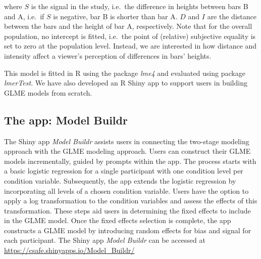 
where $S$ is the signal in the study, i.e.\ the difference in heights between bars B and A, i.e.\ if $S$ is negative, bar B is shorter than bar A.
$D$ and $I$ are the distance between the bars and the height of bar A, respectively. 
Note that for the overall population, no intercept is fitted, i.e.\ the point of (relative) subjective equality is set to zero at the population level. Instead, we are interested in how distance and intensity affect a viewer's perception of differences in bars' heights. 

This model is fitted in R using the package \textit{lme4} \cite{lme4} and evaluated using package \textit{lmerTest}\cite{lmerTest}. We have also developed an R Shiny app \cite{shiny} to support users in building GLME models from scratch.

\subsection{The app: Model Buildr}

The Shiny app {\it Model Buildr} assists users in connecting the two-stage modeling approach with the GLME modeling approach. Users can construct their GLME models incrementally, guided by prompts within the app. The process starts with a basic logistic regression for a single participant with one condition level per condition variable. Subsequently, the app extends the logistic regression by incorporating all levels of a chosen condition variable. Users have the option to apply a log transformation to the condition variables and assess the effects of this transformation. These steps aid users in determining the fixed effects to include in the GLME model. Once the fixed effects selection is complete, the app constructs a GLME model by introducing random effects for bias and signal for each participant. The Shiny app {\it Model Buildr} can be accessed at \url{https://csafe.shinyapps.io/Model_Buildr/}


